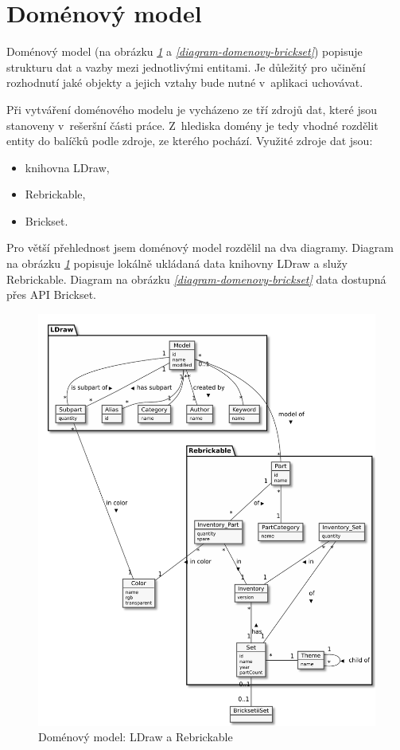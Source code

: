 \section{Doménový model}
Doménový model (na obrázku \emph{\ref{diagram-domenovy}} a \emph{\ref{diagram-domenovy-brickset}}) popisuje strukturu dat a vazby mezi jednotlivými entitami. Je důležitý pro učinění rozhodnutí jaké objekty a jejich vztahy bude nutné v~aplikaci uchovávat. 

Při vytváření doménového modelu je vycházeno ze tří zdrojů dat, které jsou stanoveny v~rešeršní části práce. Z~hlediska domény je tedy vhodné rozdělit entity do balíčků podle zdroje, ze kterého pochází. Využité zdroje dat jsou: 
\begin{itemize}
  \item knihovna LDraw,
  \item Rebrickable,
  \item Brickset.
\end{itemize}

Pro větší přehlednost jsem doménový model rozdělil na dva diagramy. Diagram na obrázku \emph{\ref{diagram-domenovy}} popisuje lokálně ukládaná data knihovny LDraw a služy Rebrickable. Diagram na obrázku \emph{\ref{diagram-domenovy-brickset}} data dostupná přes API Brickset. 

\begin{figure}[htbp]
    \centering
    \includegraphics[width=\textwidth,height=\textheight,keepaspectratio]{pdfs/domain_ldraw_rebrickable}
    \caption{Doménový model: LDraw a Rebrickable\label{diagram-domenovy}}
  \end{figure}

